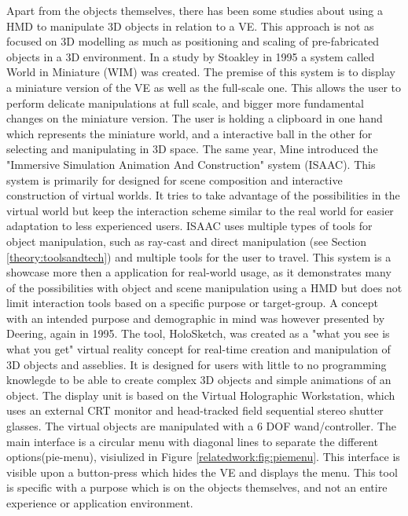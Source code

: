 Apart from the objects themselves, there has been some studies about using a HMD to manipulate 3D objects in relation to a VE. This approach is not as focused on 3D modelling as much as positioning and scaling of pre-fabricated objects in a 3D environment. In a study by Stoakley in 1995 a system called World in Miniature (WIM) was created\cite{relatedwork:stoakley1995virtual}. The premise of this system is to display a miniature version of the VE as well as the full-scale one. This allows the user to perform delicate manipulations at full scale, and bigger more fundamental changes on the miniature version. The user is holding a clipboard in one hand which represents the miniature world, and a interactive ball in the other for selecting and manipulating in 3D space. The same year, Mine introduced the "Immersive Simulation
Animation And Construction" system (ISAAC)\cite{relatedwork:mine1995isaac}. This system is primarily for designed for scene composition and interactive construction of virtual worlds. It tries to take advantage of the possibilities in the virtual world but keep the interaction scheme similar to the real world for easier adaptation to less experienced users. ISAAC uses multiple types of tools for object manipulation, such as ray-cast and direct manipulation (see Section \ref{theory:toolsandtech}) and multiple tools for the user to travel. This system is a showcase more then a application for real-world usage, as it demonstrates many of the possibilities with object and scene manipulation using a HMD but does not limit interaction tools based on a specific purpose or target-group. A concept with an intended purpose and demographic in mind was however presented by Deering, again in 1995\cite{relatedwork:deering1995holosketch}. The tool, HoloSketch, was created as a "what you see is what you get" virtual reality concept for real-time creation and manipulation of 3D objects and asseblies. It is designed for users with little to no programming knowlegde to be able to create complex 3D objects and simple animations of an object. The display unit is based on the Virtual Holographic Workstation\cite{relatedwork:deering1992high}, which uses an external CRT monitor and head-tracked field sequential stereo shutter glasses. The virtual objects are manipulated with a 6 DOF wand/controller. The main interface is a circular menu with diagonal lines to separate the different options(pie-menu), visiulized in Figure \ref{relatedwork:fig:piemenu}. This interface is visible upon a button-press which hides the VE and displays the menu. This tool is specific with a purpose which is on the objects themselves, and not an entire experience or application environment.

